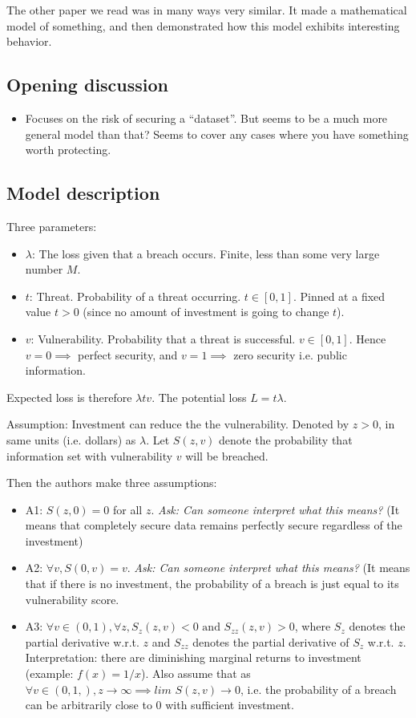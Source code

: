 \documentclass[11pt]{article}
\begin{document}
The other paper we read was in many ways very similar. It made a mathematical model of something, and then demonstrated how this model exhibits interesting behavior.

\subsection{Opening discussion}

\begin{itemize}
    \item Focuses on the risk of securing a ``dataset''. But seems to be a much more general model than that? Seems to cover any cases where you have something worth protecting.
\end{itemize}

\subsection{Model description}

Three parameters:
\begin{itemize}
    \item $\lambda$: The loss given that a breach occurs. Finite, less than some very large number $M$.
    \item $t$: Threat. Probability of a threat occurring. $t \in [0,1]$. Pinned at a fixed value $t > 0$ (since no amount of investment is going to change $t$).
    \item $v$: Vulnerability. Probability that a threat is successful. $v \in [0,1]$. Hence $v=0 \implies$ perfect security, and $v=1 \implies$ zero security i.e. public information.
\end{itemize}

Expected loss is therefore $\lambda t v$. The potential loss $L = t \lambda$.

Assumption: Investment can reduce the the vulnerability. Denoted by $z>0$, in same units (i.e. dollars) as $\lambda$. 
Let $S(z,v)$ denote the probability that information set with vulnerability $v$ will be breached. 

Then the authors make three assumptions: 
\begin{itemize}
    \item A1: $S(z,0) = 0$ for all $z$. {\it Ask: Can someone interpret what this means?} (It means that completely secure data remains perfectly secure regardless of the investment)
    \item A2: $\forall v, S(0,v) = v$.  {\it Ask: Can someone interpret what this means?} (It means that if there is no investment, the probability of a breach is just equal to its vulnerability score.
    \item A3: $\forall v \in (0,1), \forall z, S_z(z,v) < 0 \text{ and } S_{zz}(z,v)> 0$, where $S_z$ denotes the partial derivative w.r.t. $z$ and $S_{zz}$ denotes the partial derivative of $S_z$ w.r.t. $z$. Interpretation: there are diminishing marginal returns to investment (example: $f(x) = 1/x$). Also assume that as $\forall v \in (0,1,), z \rightarrow \infty \implies \textit{lim } S(z,v) \rightarrow 0$, i.e. the probability of a breach can be arbitrarily close to 0 with sufficient investment. 
\end{itemize}
\end{document}
